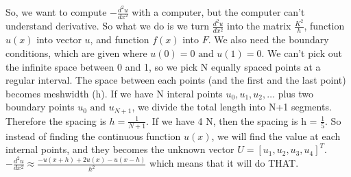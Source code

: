 So, we want to compute \(-\frac{d^2 u}{dx^2}\) with a computer, but the computer can't understand derivative. 
So what we do is we turn \(\frac{d^2 u}{dx^2}\)  into the matrix \(\frac{K^2}{h}\),
function \(u(x)\)  into vector \(u\), and function \(f(x)\) into \(F\).
We also need the boundary conditions, which are given where \(u(0) = 0 \text{ and } u(1)=0\). 
We can't pick out the infinite space between 0 and 1, so we pick N equally spaced points at a regular interval. 
The space between each points (and the first and the last point) becomes meshwidth (h). 
If we have N interal points \(u_0, u_1, u_2, \ldots\) plus two boundary points \(u_0 \text{ and } u_{N+1}\), we divide the total length into N+1 segments.
Therefore the spacing is \(h = \frac{1}{N+1}\).
If we have 4 N, then the spacing is h = \(\frac{1}{5}\).
So instead of finding the continuous function \(u(x)\), we will find the value at each internal points, and they becomes the unknown vector \(U = [u_1, u_2, u_3, u_4]^T\).
\medbreak
\(-\frac{d^2 u}{dx^2} \approx  \frac{-u(x+h) + 2u(x) - u(x-h)}{h^2}\) which means that it will do THAT.
